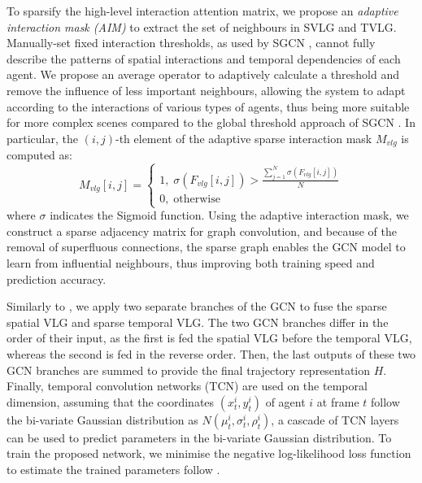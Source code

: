 \documentclass{article}
\begin{document}
To sparsify the high-level interaction attention matrix, we propose an \emph{adaptive interaction mask (AIM)} to extract the set of neighbours in SVLG and TVLG.
Manually-set fixed interaction thresholds, as used by SGCN \cite{shi2021sgcn}, cannot fully describe the patterns of spatial interactions and temporal dependencies of each agent. 
We propose an average operator to adaptively calculate a threshold and remove the influence of less important neighbours, allowing the system to adapt according to the interactions of various types of agents, thus being more suitable for more complex scenes compared to the global threshold approach of SGCN \cite{shi2021sgcn}.
In particular, the $(i,j)$-th element of the adaptive sparse interaction mask $M_{vlg}$ is computed as: 
\begin{equation}
    M_{vlg}[i,j] =
    \begin{cases}
    1, \; \sigma (F_{vlg}[i,j]) > \frac{\sum_{j=1}^N \sigma (F_{vlg}[i,j])}{N} \\
    0, \; \text{otherwise}
    \end{cases}
\end{equation} where $\sigma$ indicates the Sigmoid function. Using the adaptive interaction mask, we construct a sparse adjacency matrix for graph convolution, and because of the removal of superfluous connections, the sparse graph enables the GCN model to learn from influential neighbours, thus improving both training speed and prediction accuracy.















Similarly to \cite{shi2021sgcn}, we apply two separate branches of the GCN \cite{kipf2016gcn} to fuse the sparse spatial VLG and sparse temporal VLG. The two GCN branches differ in the order of their input, as the first is fed the spatial VLG before the temporal VLG, whereas the second is fed in the reverse order. Then, the last outputs of these two GCN branches are summed to provide the final trajectory representation $H$.
Finally, temporal convolution networks (TCN) \cite{bai2018tcn} are used on the temporal dimension, assuming that the coordinates $(x_{t}^{i}, y_{t}^{i})$ of agent $i$ at frame $t$ follow the bi-variate Gaussian distribution as $N(\mu_{t}^{i}, \sigma_{t}^{i}, \rho_{t}^{i})$, a cascade of TCN layers can be used to predict parameters in the bi-variate Gaussian distribution. To train the proposed network, we minimise the negative log-likelihood loss function to estimate the trained parameters follow \cite{Mohamed2020socialstgcnn}. 
\end{document}
